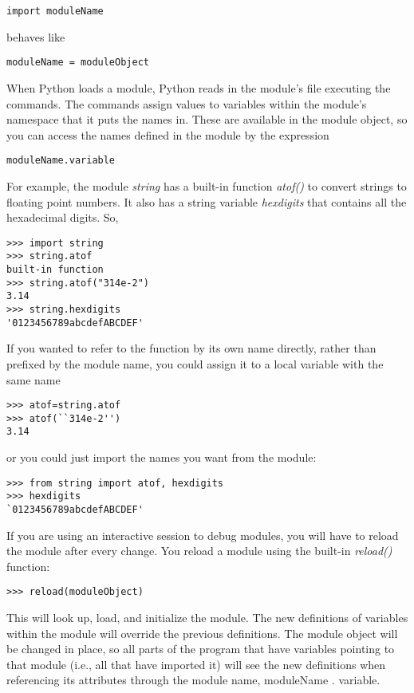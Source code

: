 \begin{verbatim}
import moduleName
\end{verbatim}

behaves like

\begin{verbatim}
moduleName = moduleObject
\end{verbatim}

When Python loads a module, Python
reads in the module's file executing the commands. The commands assign
values to variables within the module's namespace that it puts the names
in. These are available in the module object, so you can access the
names defined in the module by the expression

\begin{verbatim}
moduleName.variable
\end{verbatim}

For example, the module
\emph{string} has a built-in function \emph{atof()} to convert strings
to floating point numbers. It also has a string variable
\emph{hexdigits} that contains all the hexadecimal digits. So,


\begin{verbatim}
>>> import string
>>> string.atof
built-in function
>>> string.atof("314e-2")
3.14
>>> string.hexdigits
'0123456789abcdefABCDEF'
\end{verbatim}

If you wanted to refer to the
function by its own name directly, rather than prefixed by the module
name, you could assign it to a local variable with the same name


\begin{verbatim}
>>> atof=string.atof
>>> atof(``314e-2'')
3.14
\end{verbatim}

or you could just import the names
you want from the module:

\begin{verbatim}
>>> from string import atof, hexdigits
>>> hexdigits
`0123456789abcdefABCDEF'
\end{verbatim}

If you are using an interactive
session to debug modules, you will have to reload the module after every
change. You reload a module using the built-in \emph{reload()} function:

\begin{verbatim}
>>> reload(moduleObject)
\end{verbatim}

This will look up, load, and
initialize the module. The new definitions of variables within the
module will override the previous definitions. The module object will be
changed in place, so all parts of the program that have variables
pointing to that module (i.e., all that have imported it) will see the
new definitions when referencing its attributes through the module name,
moduleName . variable.

